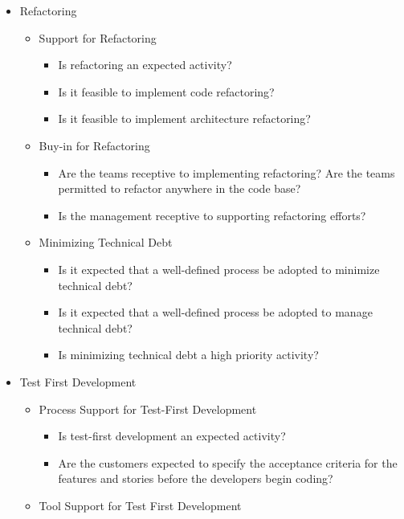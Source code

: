\begin{appendices}
\begin{itemize}
	\item Refactoring
		\begin{itemize}
			\item Support for Refactoring 
				\begin{itemize}
					\item Is refactoring an expected activity?
					\item Is it feasible to implement code refactoring?
					\item Is it feasible to implement architecture refactoring?
				\end{itemize}
			\item Buy-in for Refactoring
				\begin{itemize}
					\item Are the teams receptive to implementing refactoring?
					\addition Are the teams permitted to refactor anywhere in the code base?
					\item Is the management receptive to supporting refactoring efforts?
				\end{itemize}
			\item Minimizing Technical Debt
				\begin{itemize}
					\item Is it expected that a well-defined process be adopted to minimize technical debt?
					\item Is it expected that a well-defined process be adopted to manage technical debt?
					\item Is minimizing technical debt a high priority activity?
				\end{itemize}
		\end{itemize}	
	\item Test First Development
		\begin{itemize}
			\item Process Support for Test-First Development
				\begin{itemize}
					\item Is test-first development an expected activity?
					\item Are the customers expected to specify the acceptance criteria for the features and stories before the developers begin coding?
				\end{itemize}
		\end{itemize} 
		\begin{itemize}
			\item Tool Support for Test First Development

\end{itemize}
\end{itemize}
\end{appendices}
